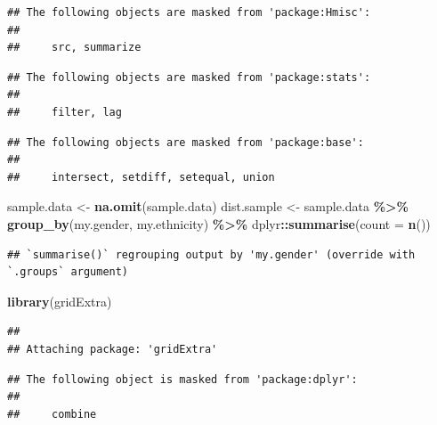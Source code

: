 \documentclass[]{article}
\newenvironment{Shaded}{\begin{snugshade}}{\end{snugshade}}
\newcommand{\DataTypeTok}[1]{\textcolor[rgb]{0.13,0.29,0.53}{#1}}
\newcommand{\DecValTok}[1]{\textcolor[rgb]{0.00,0.00,0.81}{#1}}
\newcommand{\FloatTok}[1]{\textcolor[rgb]{0.00,0.00,0.81}{#1}}
\newcommand{\KeywordTok}[1]{\textcolor[rgb]{0.13,0.29,0.53}{\textbf{#1}}}
\newcommand{\NormalTok}[1]{#1}
\newcommand{\OperatorTok}[1]{\textcolor[rgb]{0.81,0.36,0.00}{\textbf{#1}}}
\newcommand{\OtherTok}[1]{\textcolor[rgb]{0.56,0.35,0.01}{#1}}
\newcommand{\StringTok}[1]{\textcolor[rgb]{0.31,0.60,0.02}{#1}}
\begin{document}
\begin{verbatim}
## The following objects are masked from 'package:Hmisc':
## 
##     src, summarize
\end{verbatim}

\begin{verbatim}
## The following objects are masked from 'package:stats':
## 
##     filter, lag
\end{verbatim}

\begin{verbatim}
## The following objects are masked from 'package:base':
## 
##     intersect, setdiff, setequal, union
\end{verbatim}

\begin{Shaded}
\begin{Highlighting}[]
\NormalTok{sample.data \textless{}{-}}\StringTok{ }\KeywordTok{na.omit}\NormalTok{(sample.data)}
\NormalTok{dist.sample \textless{}{-}}\StringTok{ }\NormalTok{sample.data }\OperatorTok{\%\textgreater{}\%}\StringTok{ }\KeywordTok{group\_by}\NormalTok{(my.gender, my.ethnicity) }\OperatorTok{\%\textgreater{}\%}\StringTok{ }\NormalTok{dplyr}\OperatorTok{::}\KeywordTok{summarise}\NormalTok{(}\DataTypeTok{count =} \KeywordTok{n}\NormalTok{())}
\end{Highlighting}
\end{Shaded}

\begin{verbatim}
## `summarise()` regrouping output by 'my.gender' (override with `.groups` argument)
\end{verbatim}

\begin{Shaded}
\begin{Highlighting}[]
\KeywordTok{library}\NormalTok{(gridExtra)}
\end{Highlighting}
\end{Shaded}

\begin{verbatim}
## 
## Attaching package: 'gridExtra'
\end{verbatim}

\begin{verbatim}
## The following object is masked from 'package:dplyr':
## 
##     combine
\end{verbatim}

\begin{Shaded}
\end{Shaded}
\end{document}
